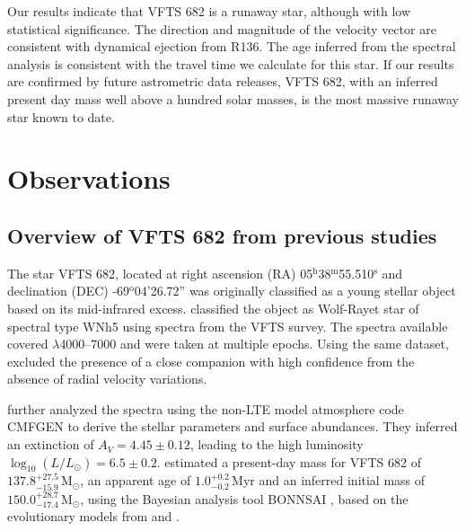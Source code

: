 \documentclass[apjl,twocolumn]{emulateapj}
\newcommand{\Msun}{{\,\mathrm{M}_\odot}}
\DeclareRobustCommand{\Tabref}[1]{Table~\ref{#1}}
\begin{document}
Our results indicate that VFTS 682 is a runaway star, although with
low statistical significance. The
direction and magnitude of the velocity vector are consistent with
dynamical ejection from R136. The age inferred from the spectral
analysis \citep[from][]{schneider:18} is consistent with the travel
time we calculate for this star. %
If our results are confirmed by future astrometric data releases, VFTS
682, with an inferred present day mass well above a hundred solar
masses, is the most massive runaway star known to date. 


\section{Observations}
\label{sec:sample}

\subsection{ Overview of VFTS 682 from previous studies \label{data:vfts683}}

The star VFTS 682, located at right ascension (RA)
05$^\mathrm{h}$38$^\mathrm{m}$55.510$^\mathrm{s}$  and declination
(DEC) \mbox{-69$^\mathrm{o}$04'26.72''} \citep[][see also
\Tabref{tab:vfts682} for updated coordinates from \emph{Gaia} DR2]{evans:11}
was originally classified as a young stellar object \citep{gruendl:09}
based on its mid-infrared excess. \citet{evans:11} classified the
object as Wolf-Rayet star of spectral type WNh5 using spectra from the
VFTS survey. The spectra available covered $\lambda$4000--7000 and
were taken at multiple epochs. Using the same dataset,
\citet{bestenlehner:11} excluded the presence of a close companion
with high confidence from the absence of radial velocity variations.

\citet{bestenlehner:11} further analyzed the spectra using the non-LTE
model atmosphere code CMFGEN \citep{hillier:98} to derive the stellar
parameters and surface abundances. They inferred an extinction
of $A_V=4.45\pm0.12$, leading to the high luminosity
$\log_{10}(L/L_\odot) =  6.5\pm0.2$. \citet{schneider:18} estimated
a present-day mass for VFTS 682 of $137.8^{+27.5}_ {-15.9}\Msun$, an
apparent age of $1.0^{+0.2}_{-0.2}$\,Myr and an inferred initial mass
of $150.0^{+28.7}_{-17.4}\Msun$, using the Bayesian analysis tool BONNSAI
\citep{schneider:17}, based on the evolutionary models from
\citet{brott:11} and \cite{kohler:15}. %
\end{document}
